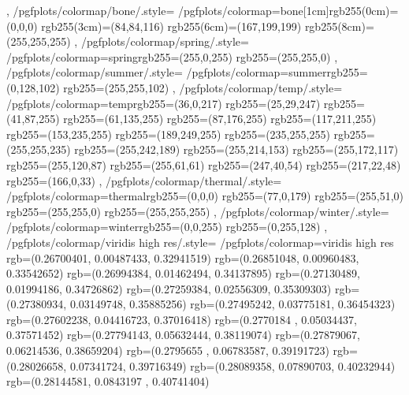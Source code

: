 {{ 	},
	/pgfplots/colormap/bone/.style={
		/pgfplots/colormap={bone}{[1cm]rgb255(0cm)=(0,0,0) rgb255(3cm)=(84,84,116) rgb255(6cm)=(167,199,199) rgb255(8cm)=(255,255,255)}
},
 	/pgfplots/colormap/spring/.style={
 		/pgfplots/colormap={spring}{rgb255=(255,0,255) rgb255=(255,255,0)}
 	},
 	/pgfplots/colormap/summer/.style={
 		/pgfplots/colormap={summer}{rgb255=(0,128,102) rgb255=(255,255,102)}
 	},
 	/pgfplots/colormap/temp/.style={
 		/pgfplots/colormap={temp}{rgb255=(36,0,217) rgb255=(25,29,247) rgb255=(41,87,255) rgb255=(61,135,255) rgb255=(87,176,255) rgb255=(117,211,255) rgb255=(153,235,255) rgb255=(189,249,255) rgb255=(235,255,255) rgb255=(255,255,235) rgb255=(255,242,189) rgb255=(255,214,153) rgb255=(255,172,117) rgb255=(255,120,87) rgb255=(255,61,61) rgb255=(247,40,54) rgb255=(217,22,48) rgb255=(166,0,33)}
 	},
 	/pgfplots/colormap/thermal/.style={
 		/pgfplots/colormap={thermal}{rgb255=(0,0,0) rgb255=(77,0,179) rgb255=(255,51,0) rgb255=(255,255,0) rgb255=(255,255,255)}
	},
 	/pgfplots/colormap/winter/.style={
 		/pgfplots/colormap={winter}{rgb255=(0,0,255) rgb255=(0,255,128)}
 	},
	/pgfplots/colormap/viridis high res/.style={%
		/pgfplots/colormap={viridis high res}{%
		  rgb=(0.26700401,  0.00487433,  0.32941519)
		  rgb=(0.26851048,  0.00960483,  0.33542652)
		  rgb=(0.26994384,  0.01462494,  0.34137895)
		  rgb=(0.27130489,  0.01994186,  0.34726862)
		  rgb=(0.27259384,  0.02556309,  0.35309303)
		  rgb=(0.27380934,  0.03149748,  0.35885256)
		  rgb=(0.27495242,  0.03775181,  0.36454323)
		  rgb=(0.27602238,  0.04416723,  0.37016418)
		  rgb=(0.2770184 ,  0.05034437,  0.37571452)
		  rgb=(0.27794143,  0.05632444,  0.38119074)
		  rgb=(0.27879067,  0.06214536,  0.38659204)
		  rgb=(0.2795655 ,  0.06783587,  0.39191723)
		  rgb=(0.28026658,  0.07341724,  0.39716349)
		  rgb=(0.28089358,  0.07890703,  0.40232944)
		  rgb=(0.28144581,  0.0843197 ,  0.40741404)
}}}
